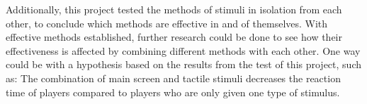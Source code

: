 Additionally, this project tested the methods of stimuli in isolation from each other, to conclude which methods are effective in and of themselves. With effective methods established, further research could be done to see how their effectiveness is affected by combining different methods with each other. One way could be with a hypothesis based on the results from the test of this project, such as: The combination of main screen and tactile stimuli decreases the reaction time of players compared to players who are only given one type of stimulus.